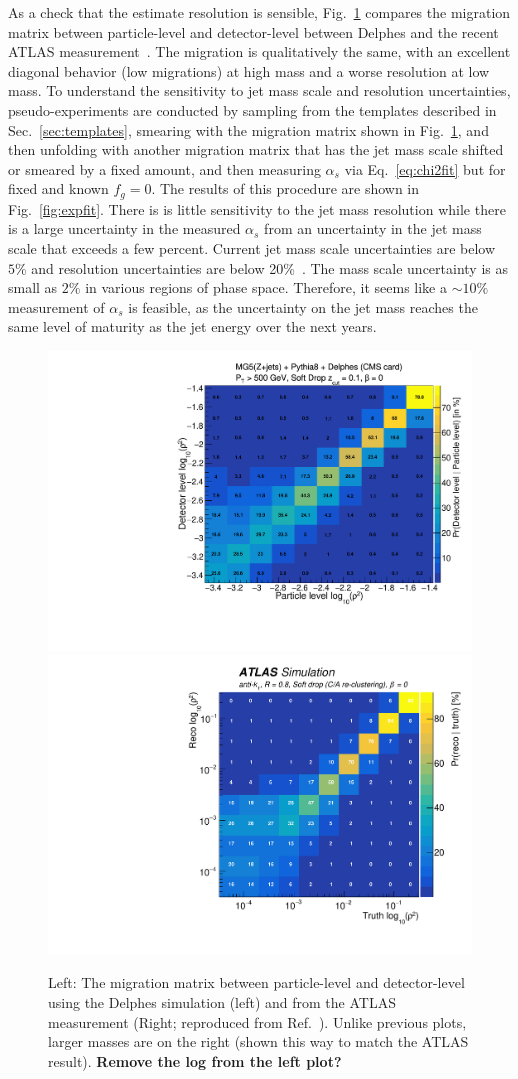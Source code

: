 As a check that the estimate resolution is sensible, Fig.~\ref{fig:expres} compares the migration matrix between particle-level and detector-level between Delphes and the recent ATLAS measurement~\cite{Aaboud:2017qwh}.  The migration is qualitatively the same, with an excellent diagonal behavior (low migrations) at high mass and a worse resolution at low mass.  To understand the sensitivity to jet mass scale and resolution uncertainties, pseudo-experiments are conducted by sampling from the templates described in Sec.~\ref{sec:templates}, smearing with the migration matrix shown in Fig.~\ref{fig:expres}, and then unfolding with another migration matrix that has the jet mass scale shifted or smeared by a fixed amount, and then measuring $\alpha_s$ via Eq.~\ref{eq:chi2fit} but for fixed and known $f_g=0$.  The results of this procedure are shown in Fig.~\ref{fig:expfit}.  There is is little sensitivity to the jet mass resolution while there is a large uncertainty in the measured $\alpha_s$ from an uncertainty in the jet mass scale that exceeds a few percent.  Current jet mass scale uncertainties are below $5\%$ and resolution uncertainties are below 20\%~\cite{}.  The mass scale uncertainty is as small as $2\%$ in various regions of phase space.  Therefore, it seems like a $\sim 10\%$ measurement of $\alpha_s$ is feasible, as the uncertainty on the jet mass reaches the same level of maturity as the jet energy over the next years.

\begin{figure}[h!]
\begin{center}
\includegraphics[width = 0.49\columnwidth]{figures/experimentaldemo/Rho_2D.pdf}\includegraphics[width = 0.49\columnwidth]{figures/figaux_03a.pdf}
\end{center}
\caption{Left: The migration matrix between particle-level and detector-level using the Delphes simulation (left) and from the ATLAS measurement (Right; reproduced from Ref.~\cite{Aaboud:2017qwh}).  Unlike previous plots, larger masses are on the right (shown this way to match the ATLAS result). \textbf{Remove the log from the left plot?}}
\label{fig:expres}
\end{figure}

